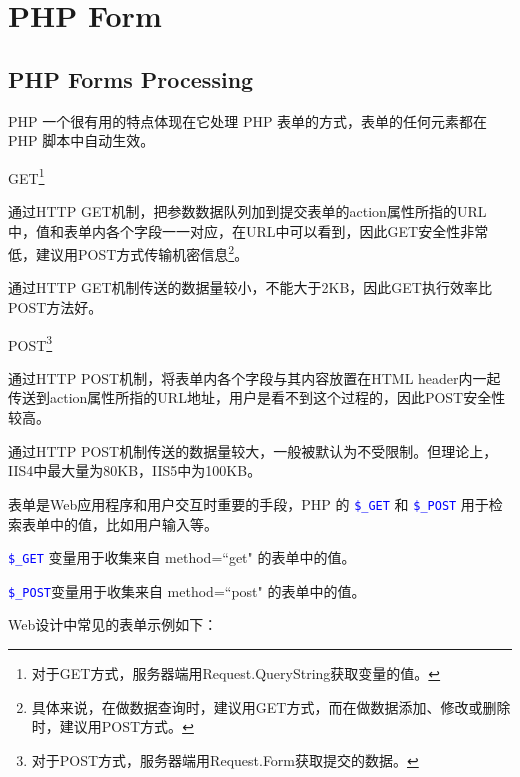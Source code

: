 \part{PHP Form}







\chapter{PHP Forms Processing}


PHP 一个很有用的特点体现在它处理 PHP 表单的方式，表单的任何元素都在 PHP 脚本中自动生效。


\begin{compactitem}
\item GET\footnote{对于GET方式，服务器端用Request.QueryString获取变量的值。}

通过HTTP GET机制，把参数数据队列加到提交表单的action属性所指的URL中，值和表单内各个字段一一对应，在URL中可以看到，因此GET安全性非常低，建议用POST方式传输机密信息\footnote{具体来说，在做数据查询时，建议用GET方式，而在做数据添加、修改或删除时，建议用POST方式。}。

通过HTTP GET机制传送的数据量较小，不能大于2KB，因此GET执行效率比POST方法好。

\item POST\footnote{对于POST方式，服务器端用Request.Form获取提交的数据。}

通过HTTP POST机制，将表单内各个字段与其内容放置在HTML header内一起传送到action属性所指的URL地址，用户是看不到这个过程的，因此POST安全性较高。

通过HTTP POST机制传送的数据量较大，一般被默认为不受限制。但理论上，IIS4中最大量为80KB，IIS5中为100KB。
\end{compactitem}




表单是Web应用程序和用户交互时重要的手段，PHP 的 \textcolor{Blue}{\texttt{\$\_GET}} 和 \textcolor{Blue}{\texttt{\$\_POST}} 用于检索表单中的值，比如用户输入等。



\begin{compactitem}
\item \textcolor{Blue}{\texttt{\$\_GET}} 变量用于收集来自 method=``get" 的表单中的值。
\item \textcolor{Blue}{\texttt{\$\_POST}}变量用于收集来自 method=``post" 的表单中的值。
\end{compactitem}

Web设计中常见的表单示例如下：


